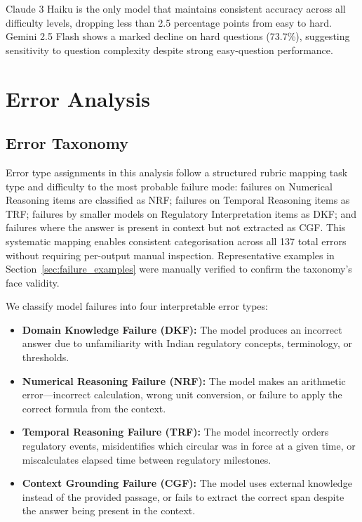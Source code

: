 \documentclass[11pt]{article}
\begin{document}
Claude 3 Haiku is the only model that maintains consistent accuracy across all
difficulty levels, dropping less than 2.5 percentage points from easy to hard.
Gemini 2.5 Flash shows a marked decline on hard questions (73.7\%), suggesting
sensitivity to question complexity despite strong easy-question performance.

\section{Error Analysis}

\subsection{Error Taxonomy}

Error type assignments in this analysis follow a structured rubric mapping task
type and difficulty to the most probable failure mode: failures on Numerical
Reasoning items are classified as NRF; failures on Temporal Reasoning items as
TRF; failures by smaller models on Regulatory Interpretation items as DKF; and
failures where the answer is present in context but not extracted as CGF. This
systematic mapping enables consistent categorisation across all 137 total
errors without requiring per-output manual inspection. Representative examples
in Section~\ref{sec:failure_examples} were manually verified to confirm the
taxonomy's face validity.

We classify model failures into four interpretable error types:

\begin{itemize}
  \item \textbf{Domain Knowledge Failure (DKF):} The model produces an
    incorrect answer due to unfamiliarity with Indian regulatory concepts,
    terminology, or thresholds.
  \item \textbf{Numerical Reasoning Failure (NRF):} The model makes an
    arithmetic error---incorrect calculation, wrong unit conversion, or failure
    to apply the correct formula from the context.
  \item \textbf{Temporal Reasoning Failure (TRF):} The model incorrectly
    orders regulatory events, misidentifies which circular was in force at a
    given time, or miscalculates elapsed time between regulatory milestones.
  \item \textbf{Context Grounding Failure (CGF):} The model uses external
    knowledge instead of the provided passage, or fails to extract the correct
    span despite the answer being present in the context.
\end{itemize}
\end{document}

